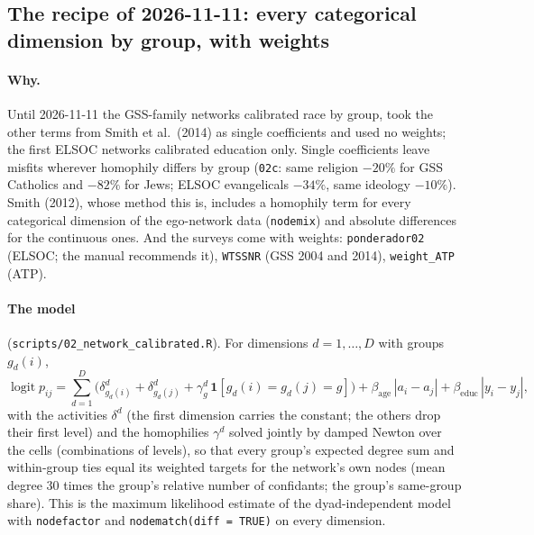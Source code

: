 \documentclass[11pt,a4paper]{article}
\newcommand{\code}[1]{\texttt{#1}}
\begin{document}
\subsection{The recipe of 2026-11-11: every categorical dimension by group, with weights}
\label{sec:pr5recipe}

\paragraph{Why.} Until 2026-11-11 the GSS-family networks calibrated race by group, took the other terms
from Smith et al.\ (2014) as single coefficients and used no weights; the first ELSOC networks calibrated
education only. Single coefficients leave misfits wherever homophily differs by group (\code{02c}: same
religion $-20\%$ for GSS Catholics and $-82\%$ for Jews; ELSOC evangelicals $-34\%$, same ideology $-10\%$).
Smith (2012), whose method this is, includes a homophily term for every categorical dimension of the
ego-network data (\code{nodemix}) and absolute differences for the continuous ones. And the surveys come
with weights: \code{ponderador02} (ELSOC; the manual recommends it), \code{WTSSNR} (GSS 2004 and 2014),
\code{weight\_ATP} (ATP).

\paragraph{The model} (\code{scripts/02\_network\_calibrated.R}). For dimensions $d = 1, \dots, D$ with
groups $g_d(i)$,
\begin{equation*}
  \operatorname{logit} p_{ij} = \sum_{d=1}^{D} \Big( \delta^{d}_{g_d(i)} + \delta^{d}_{g_d(j)}
  + \gamma^{d}_{g}\,\mathbf{1}[g_d(i) = g_d(j) = g] \Big)
  + \beta_{\text{age}}\, |a_i - a_j| + \beta_{\text{educ}}\, |y_i - y_j| ,
\end{equation*}
with the activities $\delta^d$ (the first dimension carries the constant; the others drop their first
level) and the homophilies $\gamma^d$ solved jointly by damped Newton over the cells (combinations of
levels), so that every group's expected degree sum and within-group ties equal its weighted targets for the
network's own nodes (mean degree 30 times the group's relative number of confidants; the group's
same-group share). This is the maximum likelihood estimate of the dyad-independent model with
\code{nodefactor} and \code{nodematch(diff = TRUE)} on every dimension.
\end{document}
